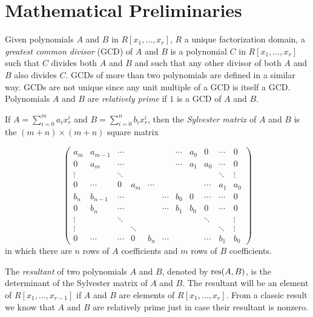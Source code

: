 \section{Mathematical Preliminaries}
Given polynomials $A$ and $B$ in $R[x_1,\ldots,x_r]$, $R$ a unique
factorization domain, a {\em greatest common divisor} (GCD) of $A$ and
$B$ is a polynomial $C$ in $R[x_1,\ldots,x_r]$ such that $C$ divides
both $A$ and $B$ and such that any other divisor of both $A$ and $B$
also divides $C$.  GCDs of more than two polynomials are defined in a
similar way. GCDs are not unique since any unit multiple of a GCD is
itself a GCD.  Polynomials $A$ and $B$ are {\em relatively prime} if
$1$ is a GCD of $A$ and $B$.

If $A = \sum_{i=0}^m{a_ix_r^i}$ and $B = \sum_{i=0}^n{b_ix_r^i}$, then
the {\em Sylvester matrix} of $A$ and $B$ is the $(m+n) \times (m+n)$
square matrix

$$ \left(  \begin{array}{ccccccccccccc}

a_m & a_{m-1} & \cdots & & & & \cdots & a_0 & 0 & \cdots & 0 \\

0 & a_m & \cdots & & & & \cdots & a_1 & a_0 & \cdots & 0 \\

\vdots & & \ddots & & & & & & & \ddots & \vdots \\ 

0 & \cdots & 0 & a_m & \cdots & & & & \cdots & a_1 & a_0 \\

b_n & b_{n-1} & \cdots & & & \cdots & b_0 & 0 & \cdots & \cdots & 0 \\

0 & b_n & \cdots & & & \cdots & b_1 & b_0 & 0 & \cdots & 0 \\

\vdots & & \ddots & & & & & & \ddots & & \vdots \\

\vdots & & & \ddots & & & & & & \ddots & \vdots \\

0 & \cdots & \cdots & 0 & b_n & \cdots & & & \cdots & b_1 & b_0 
\end{array} \right) $$
in which there are $n$ rows of $A$ coefficients and $m$ rows of $B$
coefficients.

The {\em resultant} of two polynomials $A$ and $B$, denoted by ${\rm
res}(A,B)$, is the determinant of the Sylvester matrix of $A$ and $B$.
The resultant will be an element of $R[x_1,\ldots,x_{r-1}]$ if $A$ and
$B$ are elements of $R[x_1,\ldots,x_r]$. From a classic result we know
that $A$ and $B$ are relatively prime just in case their resultant is
nonzero.

